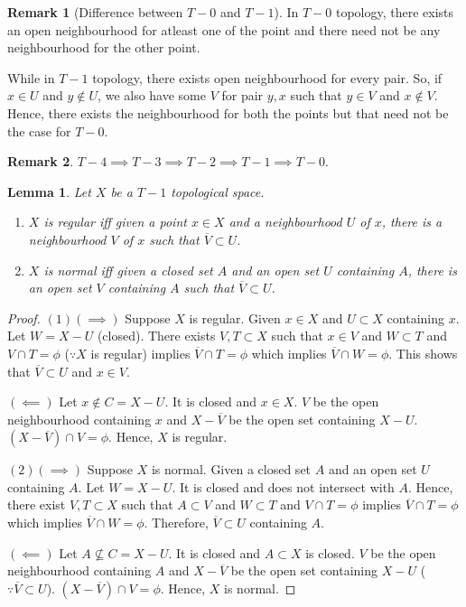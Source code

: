 \documentclass[12pt,reqno]{amsart}
\theoremstyle{plain}
\newtheorem{lem}{Lemma}
\theoremstyle{definition}
\newtheorem{rem}{Remark}
\begin{document}
\begin{rem}[Difference between $T-0$ and $T-1$]
    In $T-0$ topology, there exists an open neighbourhood for atleast one of the point and there need not be any neighbourhood for the other point.

    While in $T-1$ topology, there exists open neighbourhood for every pair. So, if $x \in U$ and $y \notin U$, we also have some $V$ for pair $y,x$ such that $y \in V$ and $x \notin V$. Hence, there exists the neighbourhood for both the points but that need not be the case for $T-0$. 
\end{rem}
\begin{rem}
    $T-4 \implies T-3 \implies T-2 \implies T-1 \implies T-0$. 
\end{rem}
\begin{lem}
    Let $X$ be a $T-1$ topological space.
    \begin{enumerate}
        \item $X$ is regular iff given a point $x \in X$ and a neighbourhood $U$ of $x$, there is a neighbourhood $V$ of $x$ such that $\overline{V} \subset U$.
        \item $X$ is normal iff given a closed set $A$ and an open set $U$ containing $A$, there is an open set $V$ containing $A$ such that $\overline{V} \subset U$.
    \end{enumerate}
\end{lem}
\begin{proof}
    $(1) (\implies)$ Suppose $X$ is regular. Given $x \in X$ and $U \subset X$ containing $x$. Let $W = X - U$ (closed). There exists $V,T \subset X$ such that $x \in V$ and $W \subset T$ and $V \cap T = \phi$ ($\because X$ is regular) implies $\overline{V} \cap T = \phi$ which implies $\overline{V} \cap W = \phi$. This shows that $ \overline{V} \subset U$ and $x \in V$.

    \noindent $(\impliedby)$ Let $x \notin C = X - U$. It is closed and $x\in X$. $V$ be the open neighbourhood containing $x$ and $X - \overline{V}$ be the open set containing $X - U$. $(X - \overline{V}) \cap V = \phi$. Hence, $X$ is regular.

    $(2) (\implies)$ Suppose $X$ is normal. Given a closed set $A$ and an open set $U$ containing $A$. Let $W = X - U$. It is closed and does not intersect with $A$. Hence, there exist $V,T \subset X$ such that $A \subset V$ and $W \subset T$ and $V \cap T = \phi$ implies $\overline{V} \cap T = \phi$ which implies $\overline{V} \cap W = \phi$. Therefore, $\overline{V} \subset U$ containing $A$.

    \noindent $(\impliedby)$ Let $A \nsubseteq C = X - U$. It is closed and $A\subset X$ is closed. $V$ be the open neighbourhood containing $A$ and $X - \overline{V}$ be the open set containing $X - U$ ($\because \overline{V} \subset U$). $(X - \overline{V}) \cap V = \phi$. Hence, $X$ is normal.
\end{proof}
\end{document}
